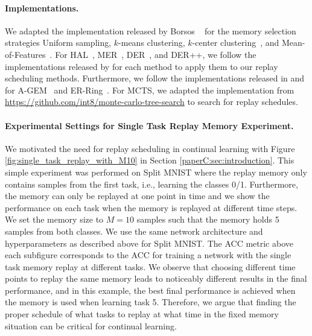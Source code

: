 \paragraph{Implementations.} We adapted the implementation released by Borsos \etal~ for the memory selection strategies Uniform sampling, $k$-means clustering, $k$-center clustering~, and Mean-of-Features~. For HAL~, MER~, DER~, and DER++, we follow the implementations released by  for each method to apply them to our replay scheduling methods. Furthermore, we follow the implementations released in  and  for A-GEM~ and ER-Ring~. For MCTS, we adapted the implementation from {\footnotesize \url{https://github.com/int8/monte-carlo-tree-search}} to search for replay schedules.

\vspace{-3mm}
\paragraph{Experimental Settings for Single Task Replay Memory Experiment.} We motivated the need for replay scheduling in continual learning with Figure \ref{fig:single_task_replay_with_M10} in Section \ref{paperC:sec:introduction}. This simple experiment was performed on Split MNIST where the replay memory only contains samples from the first task, i.e., learning the classes 0/1. Furthermore, the memory can only be replayed at one point in time and we show the performance on each task when the memory is replayed at different time steps. We set the memory size to $M=10$ samples such that the memory holds 5 samples from both classes. We use the same network architecture and hyperparameters as described above for Split MNIST. The ACC metric above each subfigure corresponds to the ACC for training a network with the single task memory replay at different tasks. We observe that choosing different time points to replay the same memory leads to noticeably different results in the final performance, and in this example, the best final performance is achieved when the memory is used when learning task 5. Therefore, we argue that finding the proper schedule of what tasks to replay at what time in the fixed memory situation can be critical for continual learning. 

